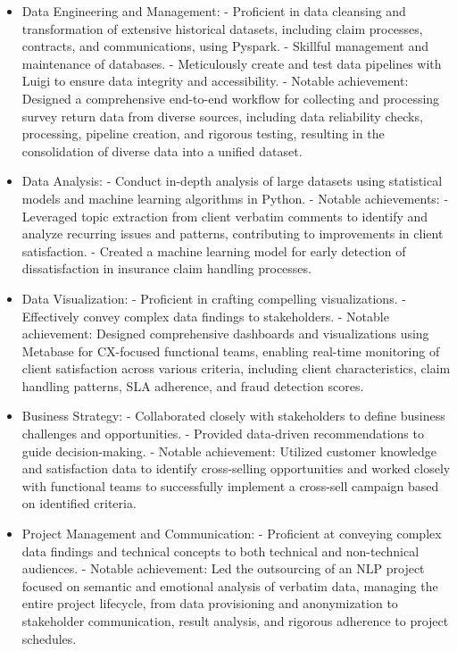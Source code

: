 \documentclass[10pt,letter,ragged2e,withhyper]{altacv}
\begin{document}
\begin{paracol}{2}



\begin{itemize}
  \item Data Engineering and Management: - Proficient in data cleansing and transformation of extensive historical datasets, including claim processes, contracts, and communications, using Pyspark. - Skillful management and maintenance of databases. - Meticulously create and test data pipelines with Luigi to ensure data integrity and accessibility. - Notable achievement: Designed a comprehensive end-to-end workflow for collecting and processing survey return data from diverse sources, including data reliability checks, processing, pipeline creation, and rigorous testing, resulting in the consolidation of diverse data into a unified dataset.
  \item Data Analysis: - Conduct in-depth analysis of large datasets using statistical models and machine learning algorithms in Python. - Notable achievements: - Leveraged topic extraction from client verbatim comments to identify and analyze recurring issues and patterns, contributing to improvements in client satisfaction. - Created a machine learning model for early detection of dissatisfaction in insurance claim handling processes.
  \item Data Visualization: - Proficient in crafting compelling visualizations. - Effectively convey complex data findings to stakeholders. - Notable achievement: Designed comprehensive dashboards and visualizations using Metabase for CX-focused functional teams, enabling real-time monitoring of client satisfaction across various criteria, including client characteristics, claim handling patterns, SLA adherence, and fraud detection scores.
  \item Business Strategy: - Collaborated closely with stakeholders to define business challenges and opportunities. - Provided data-driven recommendations to guide decision-making. - Notable achievement: Utilized customer knowledge and satisfaction data to identify cross-selling opportunities and worked closely with functional teams to successfully implement a cross-sell campaign based on identified criteria.
  \item Project Management and Communication: - Proficient at conveying complex data findings and technical concepts to both technical and non-technical audiences. - Notable achievement: Led the outsourcing of an NLP project focused on semantic and emotional analysis of verbatim data, managing the entire project lifecycle, from data provisioning and anonymization to stakeholder communication, result analysis, and rigorous adherence to project schedules.
\end{itemize}


\end{paracol}
\end{document}
